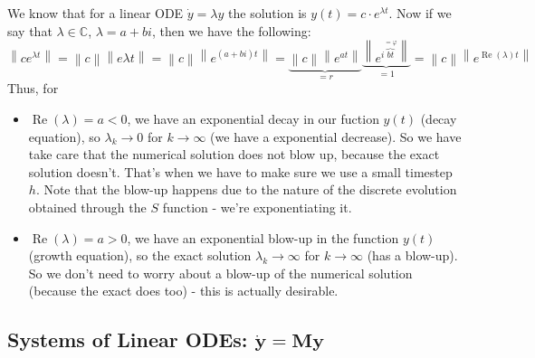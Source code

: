\documentclass[a4paper,11pt]{extarticle}
\newcommand{\tcr}[1]{\textcolor{lighttext}{#1}}
\newcommand{\tcr}[1]{\textcolor{red}{#1}}
\newcommand{\C}{\mathbb{C}}
\newcommand{\norm}[1]{\left\lVert #1 \right\rVert}
\renewcommand\Re{\operatorname{Re}}
\newcommand{\mat}[1]{\mathbf{#1}}
\renewcommand{\vec}[1]{\mathbf{#1}}
\newcommand{\vy}{\vec{y}}
\newcommand{\MM}{\mat{M}}
\begin{document}
\begin{multicols*}{2}
We know that for a linear ODE $\dot{y}=\lambda y$ the solution is $y(t)=c\cdot
e^{\lambda t}$. Now if we say that $\lambda\in\C$, $\lambda=a+bi$, then we have
the following:
\[
\norm{ce^{\lambda t}} 
= \norm{c}\norm{e{\lambda t}}
=\norm{c}\norm{e^{(a+bi)t}}
=\underbrace{\norm{c}\norm{e^{at}}}_{=r}\underbrace{\norm{e^{i\overbrace{bt}^{=\varphi}}}}_{=1}
=\norm{c}\norm{e^{\Re(\lambda)t}}
\]
Thus, for
\begin{itemize}
  \item $\Re(\lambda)=a < 0$, we have an exponential decay in our fuction
  $y(t)$ (decay equation), so $\lambda_k\to 0$ for $k\to\infty$ (we have a
  exponential decrease). \tcr{So we have take care that the numerical solution
  does not blow up, because the exact solution doesn't}. That's when we have to
  make sure we use a small timestep $h$. Note that the blow-up happens due to
  the nature of the discrete evolution obtained through the $S$ function - we're
  exponentiating it.
  \item $\Re(\lambda)=a >0$, we have an exponential blow-up in the function
  $y(t)$ (growth equation), so the exact solution $\lambda_k\to\infty$ for
  $k\to\infty$ (has a blow-up). So we don't need to worry about a blow-up of the
  numerical solution (because the exact does too) - this is actually desirable.
\end{itemize}

\subsection{Systems of Linear ODEs: $\dot{\vy}=\MM\vy$}


\end{multicols*}
\end{document}
